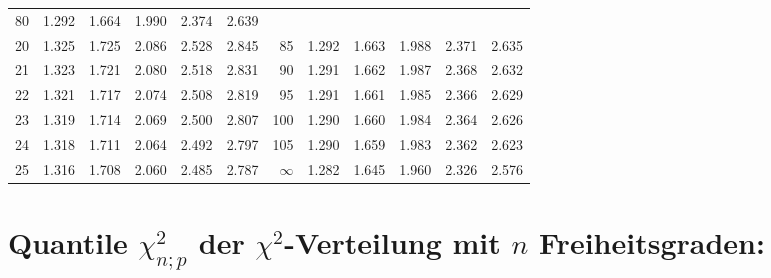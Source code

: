 {\begin{tabular} {r|rrrrr||r|rrrrr}
80 & 1.292 & 1.664 & 1.990 & 2.374 & 2.639 \\
20 & 1.325 & 1.725 & 2.086 & 2.528 & 2.845 &
85 & 1.292 & 1.663 & 1.988 & 2.371 & 2.635 \\
\hline
21 & 1.323 & 1.721 & 2.080 & 2.518 & 2.831 &
90 & 1.291 & 1.662 & 1.987 & 2.368 & 2.632 \\
22 & 1.321 & 1.717 & 2.074 & 2.508 & 2.819 &
95 & 1.291 & 1.661 & 1.985 & 2.366 & 2.629 \\
23 & 1.319 & 1.714 & 2.069 & 2.500 & 2.807 &
100 & 1.290 & 1.660 & 1.984 & 2.364 & 2.626 \\
24 & 1.318 & 1.711 & 2.064 & 2.492 & 2.797 &
105 & 1.290 & 1.659 & 1.983 & 2.362 & 2.623 \\
25 & 1.316 & 1.708 & 2.060 & 2.485 & 2.787 &
$\infty$ & 1.282 & 1.645 & 1.960 & 2.326 & 2.576 \\
\hline
\end{tabular}
}
\newpage
\section{Quantile $\chi^2_{n;p}$ der $\chi^2$-Verteilung mit $n$
Freiheitsgraden:}\label{sec:quantile_chi_verteilung}

